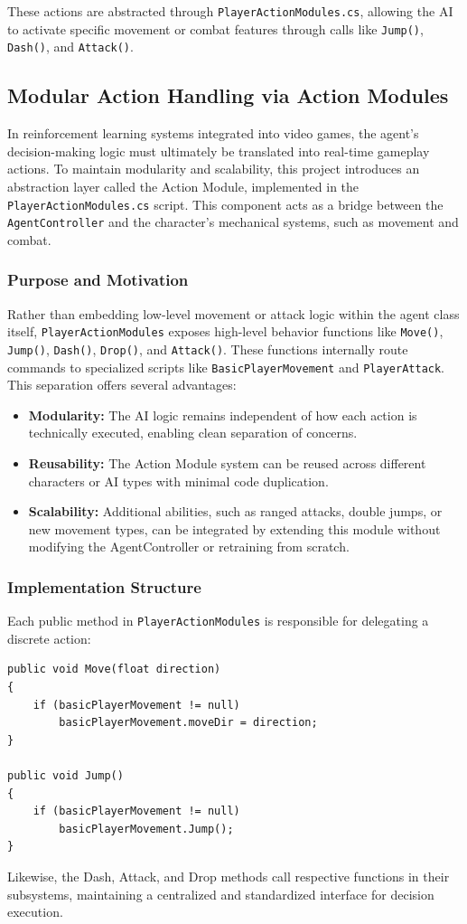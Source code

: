 \documentclass[12pt,oneside,openright,a4paper]{cpe-english-project}
\begin{document}
These actions are abstracted through \texttt{PlayerActionModules.cs}, allowing the AI to activate specific movement or combat features through calls like \texttt{Jump()}, \texttt{Dash()}, and \texttt{Attack()}.

\subsection{Modular Action Handling via Action Modules}
In reinforcement learning systems integrated into video games, the agent's decision-making logic must ultimately be translated into real-time gameplay actions. To maintain modularity and scalability, this project introduces an abstraction layer called the Action Module, implemented in the \texttt{PlayerActionModules.cs} script. This component acts as a bridge between the \texttt{AgentController} and the character's mechanical systems, such as movement and combat.

\subsubsection{Purpose and Motivation}
Rather than embedding low-level movement or attack logic within the agent class itself, \texttt{PlayerActionModules} exposes high-level behavior functions like \texttt{Move()}, \texttt{Jump()}, \texttt{Dash()}, \texttt{Drop()}, and \texttt{Attack()}. These functions internally route commands to specialized scripts like \texttt{BasicPlayerMovement} and \texttt{PlayerAttack}.
This separation offers several advantages:

\begin{itemize}
\item \textbf{Modularity:} The AI logic remains independent of how each action is technically executed, enabling clean separation of concerns.
\item \textbf{Reusability:} The Action Module system can be reused across different characters or AI types with minimal code duplication.
\item \textbf{Scalability:} Additional abilities, such as ranged attacks, double jumps, or new movement types, can be integrated by extending this module without modifying the AgentController or retraining from scratch.
\end{itemize}

\subsubsection{Implementation Structure}
Each public method in \texttt{PlayerActionModules} is responsible for delegating a discrete action:
\begin{lstlisting}[language={[Sharp]C}]
public void Move(float direction)
{
	if (basicPlayerMovement != null)
		basicPlayerMovement.moveDir = direction;
}

public void Jump()
{
	if (basicPlayerMovement != null)
		basicPlayerMovement.Jump();
}
\end{lstlisting}
Likewise, the Dash, Attack, and Drop methods call respective functions in their subsystems, maintaining a centralized and standardized interface for decision execution.\par
\end{document}
